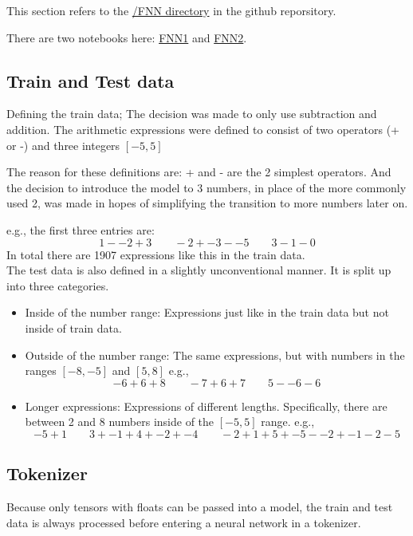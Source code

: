 \documentclass{article}
\begin{document}
This section refers to the \href{https://github.com/AntonStantan/matura/tree/main/FNN}
{/FNN directory} in the github reporsitory.

There are two notebooks here: \href{https://github.com/AntonStantan/matura/blob/main/FNN/FNN1.ipynb}
{FNN1} and \href{https://github.com/AntonStantan/matura/blob/main/FNN/FNN2.ipynb}
{FNN2}.

\subsection{Train and Test data}
Defining the train data; The decision was made to only use subtraction and 
addition. The arithmetic expressions were defined to consist of two 
operators (+ or -) and three integers $[-5, 5]$

The reason for these definitions are: + and - are the 2 simplest operators. 
And the decision to introduce the model to 3 numbers, in place of the more 
commonly used 2, was made in hopes of simplifying the transition to more 
numbers later on.

e.g., the first three entries are: 
\[
1 - -2 + 3 \qquad -2 + -3 - -5 \qquad 3 - 1 - 0
\]
{\small In total there are 1907 expressions like this in the train data.}
\\[2em]
The test data is also defined in a slightly unconventional manner. It is 
split up into three categories.
\begin{itemize}
    \item Inside of the number range: Expressions just like in the train 
data but not inside of train data. 
    \item Outside of the number range: The same expressions, but with 
numbers in the ranges $[-8, -5]$ and $[5, 8]$ e.g.,
\[
-6 + 6 + 8 \qquad -7 + 6 + 7 \qquad 5 - -6 - 6
\]
    \item Longer expressions: Expressions of different lengths. 
Specifically, there are between 2 and 8 numbers inside of the $[-5, 5]$ 
range. e.g.,
\[
-5 + 1 \qquad 3 + -1 + 4 + -2 + -4 \qquad -2 + 1 + 5 + -5 - -2 + -1 - 2 - 5
\]
\end{itemize}

\subsection{Tokenizer}

Because only tensors with floats can be passed into a model, the train 
and test data is always processed before entering a neural network in a 
tokenizer.
\end{document}
